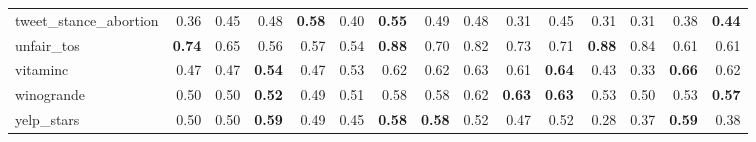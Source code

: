 \begin{table}[tbp]
{\begin{tabular}{lrrrrrrrrrrrrrr}
tweet\_stance\_abortion & 0.36 & 0.45 & 0.48 & \textbf{0.58} & 0.40 & \textbf{0.55} & 0.49 & 0.48 & 0.31 & 0.45 & 0.31 & 0.31 & 0.38 & \textbf{0.44} \\
unfair\_tos & \textbf{0.74} & 0.65 & 0.56 & 0.57 & 0.54 & \textbf{0.88} & 0.70 & 0.82 & 0.73 & 0.71 & \textbf{0.88} & 0.84 & 0.61 & 0.61 \\
vitaminc & 0.47 & 0.47 & \textbf{0.54} & 0.47 & 0.53 & 0.62 & 0.62 & 0.63 & 0.61 & \textbf{0.64} & 0.43 & 0.33 & \textbf{0.66} & 0.62 \\
winogrande & 0.50 & 0.50 & \textbf{0.52} & 0.49 & 0.51 & 0.58 & 0.58 & 0.62 & \textbf{0.63} & \textbf{0.63} & 0.53 & 0.50 & 0.53 & \textbf{0.57} \\
yelp\_stars & 0.50 & 0.50 & \textbf{0.59} & 0.49 & 0.45 & \textbf{0.58} & \textbf{0.58} & 0.52 & 0.47 & 0.52 & 0.28 & 0.37 & \textbf{0.59} & 0.38 \\
\bottomrule
\end{tabular}}
\end{table}
